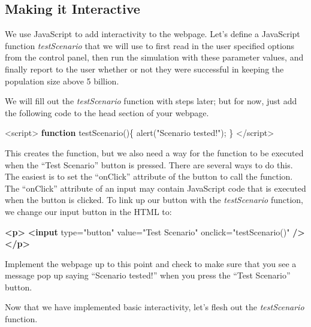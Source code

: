 \documentclass[]{memoir}
\newenvironment{Shaded}{}{}
\newcommand{\KeywordTok}[1]{\textcolor[rgb]{0.00,0.44,0.13}{\textbf{{#1}}}}
\newcommand{\StringTok}[1]{\textcolor[rgb]{0.25,0.44,0.63}{{#1}}}
\newcommand{\OtherTok}[1]{\textcolor[rgb]{0.00,0.44,0.13}{{#1}}}
\newcommand{\FunctionTok}[1]{\textcolor[rgb]{0.02,0.16,0.49}{{#1}}}
\newcommand{\NormalTok}[1]{{#1}}
\begin{document}
\subsection{Making it Interactive}

We use JavaScript to add interactivity to the webpage. Let's define a
JavaScript function \emph{testScenario} that we will use to first read
in the user specified options from the control panel, then run the
simulation with these parameter values, and finally report to the user
whether or not they were successful in keeping the population size above
5 billion.

We will fill out the \emph{testScenario} function with steps later; but
for now, just add the following code to the head section of your
webpage.

\begin{Shaded}
\begin{Highlighting}[]
\NormalTok{<script>}
    \KeywordTok{function} \FunctionTok{testScenario}\NormalTok{()\{}
        \FunctionTok{alert}\NormalTok{(}\StringTok{"Scenario tested!"}\NormalTok{);}
    \NormalTok{\}}
\NormalTok{<}\OtherTok{/script>}
\end{Highlighting}
\end{Shaded}

This creates the function, but we also need a way for the function to be
executed when the ``Test Scenario'' button is pressed. There are several
ways to do this. The easiest is to set the ``onClick'' attribute of the
button to call the function. The ``onClick'' attribute of an input may
contain JavaScript code that is executed when the button is clicked. To
link up our button with the \emph{testScenario} function, we change our
input button in the HTML to:

\begin{Shaded}
\begin{Highlighting}[]
\KeywordTok{<p>} \KeywordTok{<input}\OtherTok{ type=}\StringTok{"button"}\OtherTok{ value=}\StringTok{"Test Scenario"}\OtherTok{ onclick=}\StringTok{"testScenario()"} \KeywordTok{/>} \KeywordTok{</p>}
\end{Highlighting}
\end{Shaded}

Implement the webpage up to this point and check to make sure that you
see a message pop up saying ``Scenario tested!'' when you press the
``Test Scenario'' button.

Now that we have implemented basic interactivity, let's flesh out the
\emph{testScenario} function.
\end{document}
